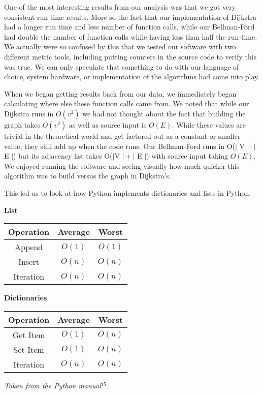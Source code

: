 \documentclass{article}
\begin{document}
\vspace{15 pt}
One of the most interesting results from our analysis was that we got very consistent run time results. More so the fact that our implementation of Dijkstra had a longer run time and less number of function calls, while our Bellman-Ford had double the number of function calls while having less than half the run-time. We actually were so confused by this that we tested our software with two different metric tools, including putting counters in the source code to verify this was true. We can only speculate that something to do with our language of choice, system hardware, or implementation of the algorithms had come into play.

When we began getting results back from our data, we immediately began calculating where else these function calls came from. We noted that while our Dijkstra runs in $O(v^2)$ we had not thought about the fact that building the graph takes $O(v^2)$ as well as source input is $O(E)$. While these values are trivial in the theoretical world and get factored out as a constant or smaller value, they still add up when the code runs. 
Our Bellman-Ford runs in O($\mid$ V $\mid \cdot \mid$ E $\mid$) but its adjacency list takes O($\mid$V $\mid + \mid$ E $\mid$) with source input taking $O(E)$. We enjoyed running the software and seeing visually how much quicker this algorithm was to build versus the graph in Dijkstra's.

This led us to look at how Python implements dictionaries and lists in Python.
\begin{multicols}{2}

\hspace{35 pt} \textbf{List}\\
\centering
\begin{tabular}{||c|c|c||}
\hline
Operation & Average & Worst \\
\hline
Append & $O(1)$ & $O(1)$ \\
\hline
Insert & $O(n)$ & $O(n)$ \\
\hline
Iteration & $O(n)$  & $O(n)$ \\
\hline
\end{tabular}

\hspace{5 pt} \textbf{Dictionaries}\\
\centering
\begin{tabular}{||c|c|c||}
\hline
Operation & Average & Worst \\
\hline
Get Item & $O(1)$ & $O(n)$ \\
\hline
Set Item & $O(1)$ & $O(n)$ \\
\hline
Iteration & $O(n)$  & $O(n)$ \\
\hline
\end{tabular}
\end{multicols}
\hspace{50 mm} \textit{Taken from the Python manual$^{15}$.}\\
\end{document}
